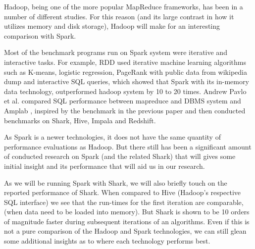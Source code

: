 \documentclass{article}
\begin{document}
Hadoop, being one of the more popular MapReduce frameworks, has been in a
number of different studies. For this reason (and its large contrast in how
it utilizes memory and disk storage), Hadoop will make for an interesting
comparison with Spark.

Most of the benchmark programs run on Spark system were iterative and
interactive tasks. For example, RDD\citep{zaharia_rdd} used iterative machine
learning algorithms such as K-means, logistic regression, PageRank with public
data from wikipedia dump and interactive SQL queries, which showed that Spark
with its in-memory data technology, outperformed hadoop system by 10 to 20
times. Andrew Pavlo et al. \cite{andrew} compared SQL performance between
mapreduce and DBMS system and Amplab \citep{amplab_bench}, inspired by the
benchmark in the previous paper and then conducted benchmarks on Shark,
Hive\citep{ashish}, Impala and Redshift.


As Spark is a newer technologies, it does not have the same quantity of
performance evaluations as Hadoop. But there still has been a significant
amount of conducted research on Spark (and the related Shark) that will gives
some initial insight and its performance that will aid us in our research.






As we will be running Spark with Shark, we will also briefly touch on the
reported performance of Shark. When compared to Hive (Hadoop's respective
SQL interface) we see that the run-times for the first iteration are comparable,
(when data need to be loaded into memory). But Shark is shown to be 10 orders
of magnitude faster during subsequent iterations of an algorithms\citep{engle}.
Even if this is not a pure comparison of the Hadoop and Spark technologies, we
can still glean some additional insights as to where each technology performs
best.
\end{document}
